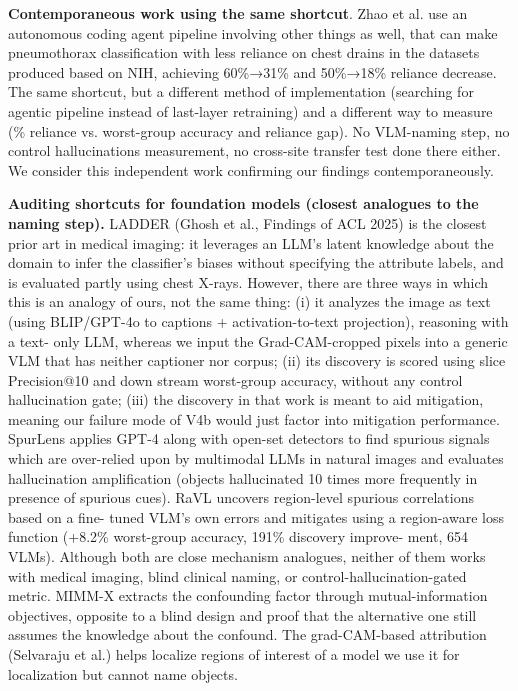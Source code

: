 \documentclass{ieeeaccess}
\begin{document}
\textbf{Contemporaneous work using the same shortcut}. Zhao et al.
use an autonomous coding agent pipeline involving other
things as well, that can make pneumothorax classification
with less reliance on chest drains in the datasets produced
based on NIH, achieving 60\%→31\% and 50\%→18\%
reliance decrease. The same shortcut, but a different method
of implementation (searching for agentic pipeline instead of
last-layer retraining) and a different way to measure (\%
reliance vs. worst-group accuracy and reliance gap). No
VLM-naming step, no control hallucinations measurement,
no cross-site transfer test done there either. We consider
this independent work confirming our findings contemporaneously.

\textbf{Auditing shortcuts for foundation models (closest analogues
to the naming step).} LADDER (Ghosh et al., Findings of
ACL 2025) is the closest prior art in medical imaging: it leverages
an LLM’s latent knowledge about the domain to infer the
classifier’s biases without specifying the attribute labels, and is
evaluated partly using chest X-rays. However, there are three
ways in which this is an analogy of ours, not the same thing:
(i) it analyzes the image as text (using BLIP/GPT-4o to captions + activation-to-text projection), reasoning with a text-
only LLM, whereas we input the Grad-CAM-cropped pixels
into a generic VLM that has neither captioner nor corpus;
(ii) its discovery is scored using slice Precision@10 and down
stream worst-group accuracy, without any control hallucination gate; (iii) the discovery in that work is meant to aid mitigation, meaning our failure mode of V4b would just factor
into mitigation performance. SpurLens applies GPT-4 along with open-set detectors to find
spurious signals which are over-relied upon by multimodal LLMs
in natural images and evaluates hallucination amplification (objects
hallucinated 10 times more frequently in presence of spurious cues).
RaVL uncovers region-level spurious correlations based on a fine-
tuned VLM’s own errors and mitigates using a region-aware loss
function (+8.2\% worst-group accuracy, 191\% discovery improve-
ment, 654 VLMs). Although both are close mechanism analogues,
neither of them works with medical imaging, blind clinical naming, or control-hallucination-gated metric. MIMM-X extracts the
confounding factor through mutual-information objectives, opposite to a blind design and proof that the alternative one still assumes the knowledge about the confound. The grad-CAM-based
attribution (Selvaraju et al.) helps localize regions of interest of a
model  we use it for localization  but cannot name objects.
\end{document}
